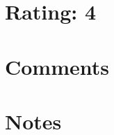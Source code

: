\documentclass [12pt]{article}
\begin{document}
    \section{Rating: 4} %
    \label{sec:rating}

    \section{Comments} %
    \label{sec:comments}
 
        

    \section{Notes}
\end{document}
